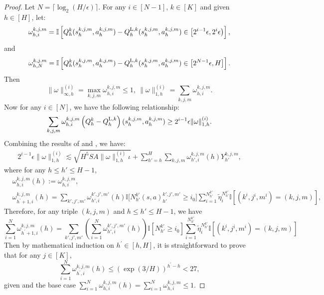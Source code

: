 \documentclass{article}
\newcommand{\LL}{\textnormal{L}}
\begin{document}
\begin{proof}
Let $N =\lceil \log_2(H/\epsilon) \rceil$. For any $i \in [N-1]$, $k \in [K]$ and given $h \in [H]$, let:
$$\omega_{h,i}^{k,j,m} = \mathbb{I}\left[Q_h^k(s_h^{k,j,m}, a_h^{k,j,m}) - Q_h^{\LL,k}(s_h^{k,j,m}, a_h^{k,j,m}) \in \big[2^{i-1}\epsilon,2^i\epsilon\big)\right],$$
and
$$\omega_{h,N}^{k,j,m} = \mathbb{I}\left[Q_h^k(s_h^{k,j,m}, a_h^{k,j,m}) - Q_h^{\LL,k}(s_h^{k,j,m}, a_h^{k,j,m}) \in \big[2^{N-1}\epsilon,H\big]\right].$$
Then
$$\|\omega\|_{\infty,h}^{(i)} = \mathop{\max}\limits_{k,j,m}\omega_{h,i}^{k,j,m} \leq 1,\ \|\omega\|_{1,h}^{(i)} = \sum_{k,j,m}\omega_{h,i}^{k,j,m}.$$
Now for any $i \in [N]$, we have the following relationship:
\begin{equation}
        \label{difflower}
        \sum_{k,j,m} \omega_{h,i}^{k,j,m} \left(Q_h^k - Q_h^{\LL,k}\right)(s_h^{k,j,m}, a_h^{k,j,m}) \geq 2^{i-1}\epsilon\|\omega\|_{1,h}^{(i)}.
    \end{equation}
    Combining the results of  and , we have:
    \begin{align}
    \label{ini}
        2^{i-1}\epsilon\|\omega\|_{1,h}^{(i)} \lesssim \sqrt{H^5SA\|\omega\|_{1,h}^{(i)}\iota} + \sum_{h' = h}^{H}\sum_{k,j,m} \omega_{h',i}^{k,j,m}(h)Y_{h'}^{k,j,m},
    \end{align}
    where for any $h \leq h' \leq H-1$,
    \begin{align*}
    &\omega_{h,i}^{k,j,m}(h) := \omega_{h,i}^{k,j,m}, \nonumber\\  
    &\omega_{h^\prime+1,i}^{k,j,m}(h)  = \sum_{k',j',m'}\omega_{h',i}^{k',j',m'}(h)\mathbb{I}\big[N_{h'}^{k'}(s,a)_{h'}^{k',j',m'} \geq i_0 \big]\sum_{i = 1}^{N_{h'}^{k'}}\tilde{\eta}_i^{N_{h'}^{k'}}\mathbb{I}\left[(k^i,j^i,m^i) = (k,j,m) \right],
\end{align*}
Therefore, for any triple $(k,j,m)$ and $h \leq h' \leq H-1$, we have
$$\sum_{i=1}^{N} \omega_{h^\prime+1,i}^{k,j,m}(h)  = \sum_{k',j',m'}\left(\sum_{i=1}^{N}\omega_{h',i}^{k',j',m'}(h)\right)\mathbb{I}\left[N_{h'}^{k'} \geq i_0 \right]\sum_{i = 1}^{N_{h'}^{k'}}\tilde{\eta}_i^{N_{h'}^{k'}}\mathbb{I}\left[(k^i,j^i,m^i) = (k,j,m) \right]$$
Then by mathematical induction on $h^\prime \in [h,H]$, it is straightforward to prove that for any $j \in [K]$,
\begin{equation}
\label{omegaprime}
    \sum_{i=1}^N \omega_{h^\prime,i}^{k,j,m}(h) \leq \left( \exp(3/H)\right)^{h^\prime - h} < 27,
\end{equation} given  and the base case $\sum_{i=1}^N \omega_{h,i}^{k,j,m}(h) = \sum_{i=1}^N \omega_{h,i}^{k,j,m} \leq 1$.

\end{proof}
\end{document}
